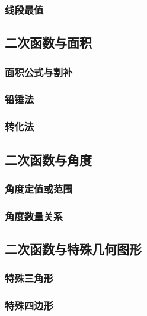\subsubsection*{线段最值}

\subsection{二次函数与\textbf{面积}}

\subsubsection*{面积公式与割补}

\subsubsection*{铅锤法}

\subsubsection*{转化法}

\subsection{二次函数与\textbf{角度}}

\subsubsection*{角度定值或范围}

\subsubsection*{角度数量关系}

\subsection{二次函数与\textbf{特殊几何图形}}

\subsubsection*{特殊三角形}

\subsubsection*{特殊四边形}